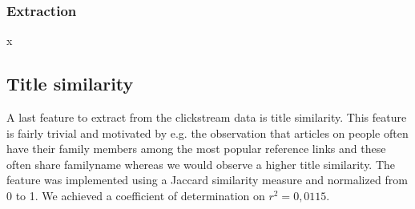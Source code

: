 \subsubsection{Extraction}
x




\subsection{Title similarity}
A last feature to extract from the clickstream data is title similarity. This feature is fairly trivial and motivated by e.g. the observation that articles on people often have their family members among the most popular reference links and these often share familyname whereas we would observe a higher title similarity. The feature was implemented using a Jaccard similarity measure and normalized from 0 to 1. We achieved a coefficient of determination on $r^2 = 0,0115$.


 \\